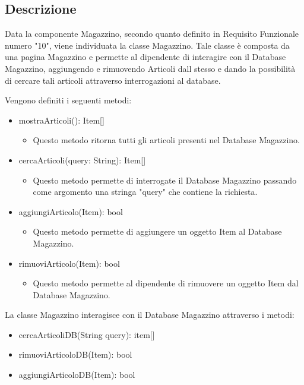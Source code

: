 \documentclass{report}
\begin{document}
\subsection*{Descrizione}
Data la componente Magazzino, secondo quanto definito in Requisito Funzionale numero "10", viene individuata la classe Magazzino. Tale classe è composta da una pagina Magazzino e permette al dipendente di interagire con il Database Magazzino, aggiungendo e rimuovendo Articoli dall stesso e dando la possibilità di cercare tali articoli attraverso interrogazioni al database. 

Vengono definiti i seguenti metodi:


\begin{itemize}
\item mostraArticoli(): Item[]
\begin{itemize}
	\item Questo metodo ritorna tutti gli articoli presenti nel Database Magazzino.
\end{itemize}

\item cercaArticoli(query: String): Item[]
\begin{itemize}
	\item Questo metodo permette di interrogate il Database Magazzino passando come argomento una stringa "query" che contiene la richiesta.
\end{itemize}

\item aggiungiArticolo(Item): bool
\begin{itemize}
	\item Questo metodo permette di aggiungere un oggetto Item al Database Magazzino.
\end{itemize}

\item rimuoviArticolo(Item): bool
\begin{itemize}
	\item Questo metodo permette al dipendente di rimuovere un oggetto Item dal Database Magazzino.
\end{itemize}

\end{itemize}

La classe Magazzino interagisce con il Database Magazzino attraverso i metodi:

\begin{itemize}
\item cercaArticoliDB(String query): item[]
\item rimuoviArticoloDB(Item): bool
\item aggiungiArticoloDB(Item): bool
\end{itemize}
\end{document}
